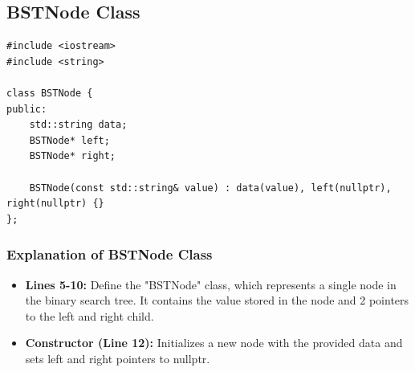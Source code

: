 \documentclass{article}
\begin{document}
\subsection{BSTNode Class}

\begin{lstlisting}[caption={BSTNode Class}]
#include <iostream>
#include <string>

class BSTNode {
public:
    std::string data;
    BSTNode* left;
    BSTNode* right;

    BSTNode(const std::string& value) : data(value), left(nullptr), right(nullptr) {}
};
\end{lstlisting}

\subsubsection{Explanation of BSTNode Class}
\begin{itemize}
    \item \textbf{Lines 5-10:} Define the "BSTNode" class, which represents a single node in the binary search tree. It contains the value stored in the node and 2 pointers to the left and right child.
    \item \textbf{Constructor (Line 12):} Initializes a new node with the provided data and sets left and right pointers to nullptr.
\end{itemize}
\end{document}

